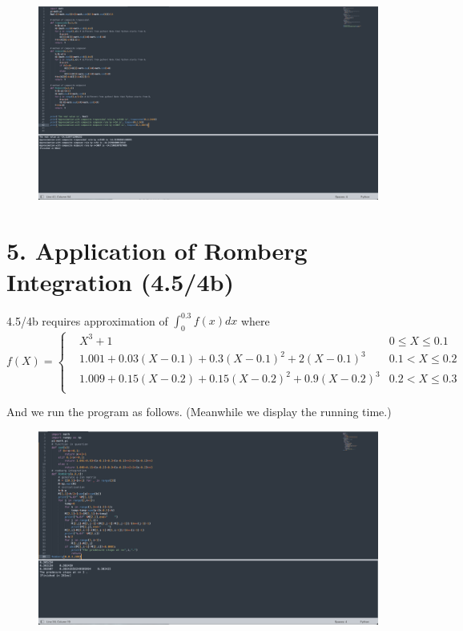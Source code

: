 \documentclass{article}
\begin{document}
    \begin{figure}[h]
    \centering
    \includegraphics[scale=0.3]{Program2}
    \end{figure}

\newpage

\section{5. Application of Romberg Integration (4.5/4b)}
    
    4.5/4b requires approximation of $\int_{0}^{0.3}f(x)dx$ where
    $$
    f(X)=\left\{
    \begin{array}{rcl}
    &X^3+1  & {0 \leq X\leq 0.1 }\\
    &1.001+0.03(X-0.1)+0.3(X-0.1)^2+2(X-0.1)^3 & {0.1 < X\leq 0.2 }\\
    &1.009+0.15(X-0.2)+0.15(X-0.2)^2+0.9(X-0.2)^3  & {0.2 < X\leq 0.3 }\\
    \end{array} \right.
    $$

    And we run the program as follows. (Meanwhile we display the running time.)

    \begin{figure}[h]
    \centering
    \includegraphics[scale=0.28]{Program3}
    \end{figure}
\end{document}

